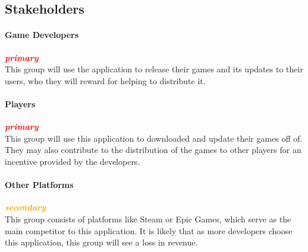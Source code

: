 
\subsection*{Stakeholders}

\newcommand{\primary}{\hspace*{\fill}\textbf{\textit{\textcolor{red}{primary}}}\\}
\newcommand{\secondary}{\hspace*{\fill}\textbf{\textit{\textcolor{orange}{secondary}}}\\}
\newcommand{\tertiary}{\hspace*{\fill}\textbf{\textit{tertiary}}\\}

\paragraph{Game Developers}\primary
This group will use the application to release their games and its updates to their users, who they will reward for helping to distribute it.

\paragraph{Players}\primary
This group will use this application to downloaded and update their games off of. They may also contribute to the distribution of the games to other players for an incentive provided by the developers.

\paragraph{Other Platforms}\secondary
This group consists of platforms like Steam or Epic Games, which serve as the main competitor to this application. It is likely that as more developers choose this application, this group will see a loss in revenue.
